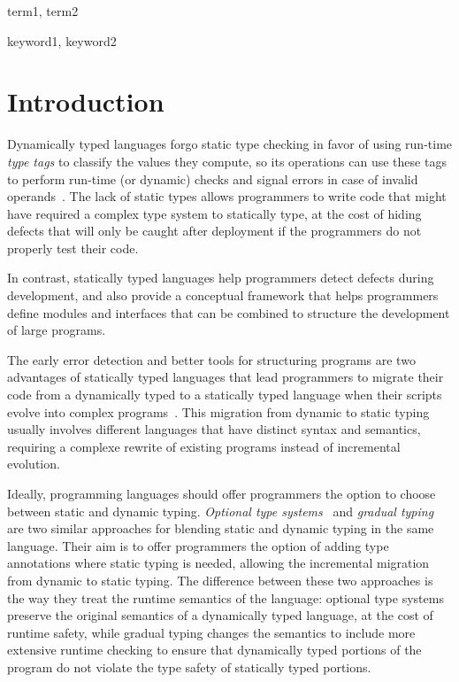 \documentclass{sigplanconf}
\begin{document}

\terms
term1, term2

\keywords
keyword1, keyword2

\section{Introduction}
\label{sec:intro}

Dynamically typed languages forgo static type checking
in favor of using run-time {\em type tags} to classify
the values they compute, so its operations can use these
tags to perform run-time (or dynamic) checks and signal
errors in case of invalid operands~\cite{pierce2002tpl}.
The lack of static types allows programmers to write code
that might have required a complex type system to statically
type, at the cost of hiding defects that will only be caught
after deployment if the programmers do not properly
test their code.

In contrast, statically typed languages help programmers
detect defects during development, and also provide
a conceptual framework that helps programmers define modules
and interfaces that can be combined to structure the development
of large programs.

The early error detection and better tools for structuring
programs are two advantages of statically typed languages that
lead programmers to migrate their code from a dynamically
typed to a statically typed language when their scripts
evolve into complex programs~\cite{tobin-hochstadt2006ims}.
This migration from dynamic to static typing usually involves
different languages that have distinct syntax and semantics,
requiring a complexe rewrite of existing programs instead of
incremental evolution.

Ideally, programming languages should offer programmers the
option to choose between static and dynamic typing.
\emph{Optional type systems}~\cite{bracha2004pluggable} and
\emph{gradual typing}~\cite{siek2006gradual} are two similar
approaches for blending static and dynamic typing in the same
language. Their aim is to offer programmers the option
of adding type annotations where static typing is needed,
allowing the incremental migration from dynamic to static
typing. The difference between these two approaches is the
way they treat the runtime semantics of the language:
optional type systems preserve the original semantics
of a dynamically typed language, at the cost of runtime
safety, while gradual typing changes the semantics to
include more extensive runtime checking to ensure that
dynamically typed portions of the program do not violate
the type safety of statically typed portions.
\end{document}
